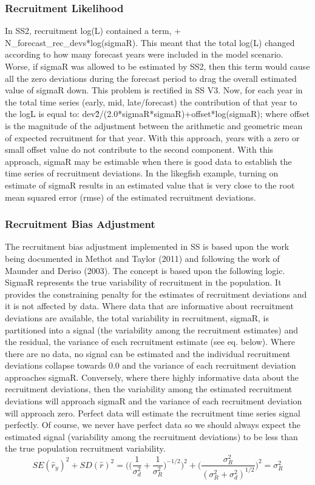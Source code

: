 \subsubsection{Recruitment Likelihood}
In SS2, recruitment log(L) contained a term, + N\_forecast\_rec\_devs*log(sigmaR).  This meant that the total log(L) changed according to how many forecast years were included in the model scenario.  Worse, if sigmaR was allowed to be estimated by SS2, then this term would cause all the zero deviations during the forecast period to drag the overall estimated value of sigmaR down.  This problem is rectified in SS V3.  Now, for each year in the total time series (early, mid, late/forecast) the contribution of that year to the logL is equal to:  dev\^2/(2.0*sigmaR*sigmaR)+offset*log(sigmaR); where offset is the magnitude of the adjustment between the arithmetic and geometric mean of expected recruitment for that year.  With this approach, years with a zero or small offset value do not contribute to the second component.  With this approach, sigmaR may be estimable when there is good data to establish the time series of recruitment deviations.  In the likegfish example, turning on estimate of sigmaR results in an estimated value that is very close to the root mean squared error (rmse) of the estimated recruitment deviations.

\subsubsection{Recruitment Bias Adjustment}
The recruitment bias adjustment implemented in SS is based upon the work being documented in Methot and Taylor (2011) and following the work of Maunder and Deriso (2003).  The concept is based upon the following logic.  SigmaR represents the true variability of recruitment in the population.  It provides the constraining penalty for the estimates of recruitment deviations and it is not affected by data.  Where data that are informative about recruitment deviations are available, the total variability in recruitment, sigmaR, is partitioned into a signal (the variability among the recruitment estimates) and the residual, the variance of each recruitment estimate (see eq. below).  Where there are no data, no signal can be estimated and the individual recruitment deviations collapse towards 0.0 and the variance of each recruitment deviation approaches sigmaR.  Conversely, where there highly informative data about the recruitment deviations, then the variability among the estimated recruitment deviations will approach sigmaR and the variance of each recruitment deviation will approach zero.  Perfect data will estimate the recruitment time series signal perfectly.  Of course, we never have perfect data so we should always expect the estimated signal (variability among the recruitment deviations) to be less than the true population recruitment variability.
\begin{equation}
	SE(\hat{r}_y)^2 + SD(\hat{r})^2=\Bigg( \bigg( \frac{1}{\sigma^2_d}+\frac{1}{\sigma^2_R}\bigg)^{-1/2}\Bigg)^2+\Bigg( \frac{\sigma^2_R}{(\sigma^2_R+\sigma^2_d)^{1/2}}\Bigg)^2=\sigma^2_R
\end{equation}

